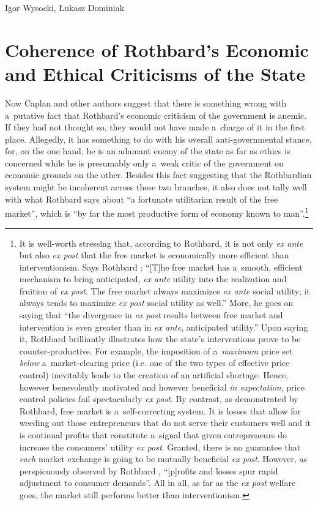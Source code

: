 \begin{artengenv}{Igor Wysocki, Łukasz Dominiak}
\section{Coherence of Rothbard's Economic and Ethical Criticisms of the State}

Now Caplan and other authors suggest that there is something wrong with a~putative fact that Rothbard's economic criticism of the government is anemic. If they had not thought so, they would not have made a~charge of it in the first place. Allegedly, it has something to do with his overall anti-governmental stance, for, on the one hand, he is an adamant enemy of the state as far as ethics is concerned while he is presumably only a~weak critic of the government on economic grounds on the other. Besides this fact suggesting that the Rothbardian system might be incoherent across these two branches, it also does not tally well with what Rothbard says about ``a fortunate utilitarian result of the free market'', which is ``by far the most productive form of economy known to man''.\footnote{It is well-worth stressing that, according to Rothbard, it is not only \textit{ex ante} but also \textit{ex post} that the free market is economically more efficient than interventionism. Says Rothbard 
\parencite*[][p.891]{rothbard_man_2009}: %
 ``[T]he free market has a~smooth, efficient mechanism to bring anticipated, \textit{ex ante} utility into the realization and fruition of \textit{ex post}. The free market always maximizes \textit{ex ante} social utility; it always tends to maximize \textit{ex post} social utility as well.'' More, he goes on saying that ``the divergence in \textit{ex post} results between free market and intervention is even greater than in \textit{ex ante}, anticipated utility.'' Upon saying it, Rothbard brilliantly illustrates how the state's interventions prove to be counter-productive. For example, the imposition of a~\textit{maximum} price set \textit{below} a~market-clearing price (i.e. one of the two types of effective price control) inevitably leads to the creation of an artificial shortage. Hence, however benevolently motivated and however beneficial \textit{in expectation}, price control policies fail spectacularly \textit{ex post}. By contrast, as demonstrated by Rothbard, free market is a~self-correcting system. It is losses that allow for weeding out those entrepreneurs that do not serve their customers well and it is continual profits that constitute a~signal that given entrepreneurs do increase the consumers' utility \textit{ex post}. Granted, there is no guarantee that \textit{each} market exchange is going to be mutually beneficial \textit{ex post}. However, as perspicuously observed by Rothbard 
\parencite*[][p.885]{rothbard_man_2009}, %
 ``[p]rofits and losses spur rapid adjustment to consumer demands''. All in all, as far as the \textit{ex post} welfare goes, the market still performs better than interventionism. } 
\parencite[][p.48]{rothbard_for_2006}%





\end{artengenv}
